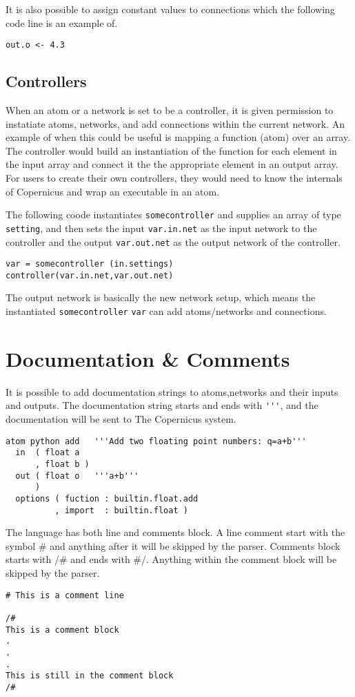 It is also possible to assign constant values to connections which the
following code line is an example of.

\begin{verbatim}
out.o <- 4.3
\end{verbatim}

\subsection{Controllers} \label{sec:control}
When an atom or a network is set to be a controller, it is given
permission to instatiate atoms, networks, and add connections within
the current network. An example of when this could be useful is
mapping a function (atom) over an array. The controller would build an
instantiation of the function for each element in the input array and
connect it the the appropriate element in an output array. For users
to create their own controllers, they would need to know the internals
of Copernicus and wrap an executable in an atom.

The following coode instantiates \verb#somecontroller# and supplies an
array of type \verb#setting#, and then sets the input
\verb#var.in.net# as the input network to the controller and the
output \verb#var.out.net# as the output network of the controller. 

\begin{verbatim}
var = somecontroller (in.settings)
controller(var.in.net,var.out.net)
\end{verbatim}

The output network is basically the new network setup, which means the
instantiated \verb#somecontroller# \verb#var# can add atoms/networks
and connections.

\section{Documentation \& Comments}
It is possible to add documentation strings to atoms,networks and
their inputs and outputs. The documentation string starts and ends
with \verb#'''#, and the documentation will be sent to The Copernicus
system.

\begin{verbatim}
atom python add   '''Add two floating point numbers: q=a+b'''
  in  ( float a
      , float b )
  out ( float o   '''a+b'''
      )
  options ( fuction : builtin.float.add
          , import  : builtin.float )
\end{verbatim}

The language has both line and comments block. A line comment start
with the symbol \# and anything after it will be skipped by the
parser. Comments block starts with /\# and ends with \#/. Anything
within the comment block will be skipped by the parser.

\begin{verbatim}
# This is a comment line

/#
This is a comment block
.
.
.
This is still in the comment block
/#
\end{verbatim}
